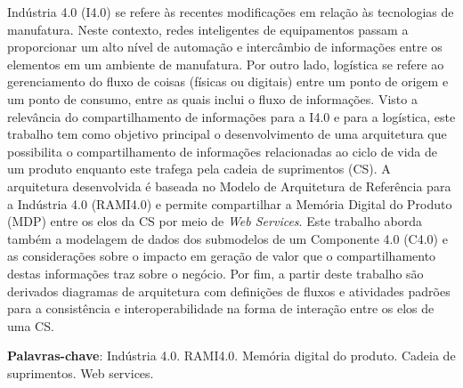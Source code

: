 \setlength{\absparsep}{18pt} %
\begin{resumo}
	Indústria 4.0 (I4.0) se refere às recentes modificações em relação às tecnologias de manufatura. Neste contexto, redes inteligentes de equipamentos passam a proporcionar um alto nível de automação e intercâmbio de informações entre os elementos em um ambiente de manufatura. Por outro lado, logística se refere ao gerenciamento do fluxo de coisas (físicas ou digitais) entre um ponto de origem e um ponto de consumo, entre as quais inclui o fluxo de informações. Visto a relevância do compartilhamento de informações para a I4.0 e para a logística, este trabalho tem como objetivo principal o desenvolvimento de uma arquitetura que possibilita o compartilhamento de informações relacionadas ao ciclo de vida de um produto enquanto este trafega pela cadeia de suprimentos (CS). A arquitetura desenvolvida é baseada no Modelo de Arquitetura de Referência para a Indústria 4.0 (RAMI4.0) e permite compartilhar a Memória Digital do Produto (MDP) entre os elos da CS por meio de \textit{Web Services}. Este trabalho aborda também a modelagem de dados dos submodelos de um Componente 4.0 (C4.0) e as considerações sobre o impacto em geração de valor que o compartilhamento destas informações traz sobre o negócio. Por fim, a partir deste trabalho são derivados diagramas de arquitetura com definições de fluxos e atividades padrões para a consistência e interoperabilidade na forma de interação entre os elos de uma CS.

	\vspace{\onelineskip}

	\noindent
	\textbf{Palavras-chave}: Indústria 4.0. RAMI4.0. Memória digital do produto. Cadeia de suprimentos. Web services.
\end{resumo}


